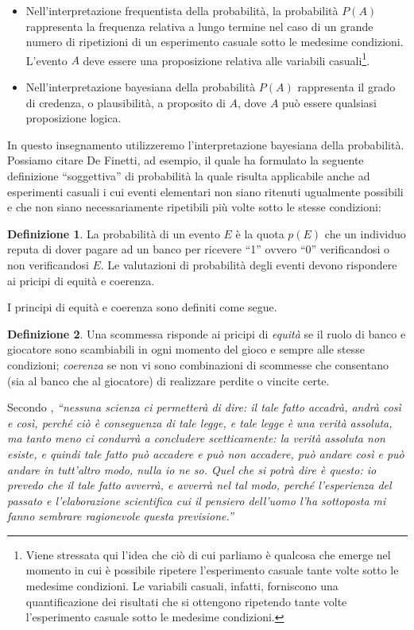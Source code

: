 \documentclass[
  11pt,
]{krantz}
\theoremstyle{definition}
\newtheorem{definition}{Definizione}[chapter]
\theoremstyle{definition}
\theoremstyle{definition}
\theoremstyle{definition}
\theoremstyle{remark}
\begin{document}
\begin{itemize}
\item
  Nell'interpretazione frequentista della probabilità, la probabilità \(P(A)\) rappresenta la frequenza relativa a lungo termine nel caso di un grande numero di ripetizioni di un esperimento casuale sotto le medesime condizioni. L'evento \(A\) deve essere una proposizione relativa alle variabili casuali\footnote{Viene stressata qui l'idea che ciò di cui parliamo è qualcosa che emerge nel momento in cui è possibile ripetere l'esperimento casuale tante volte sotto le medesime condizioni. Le variabili casuali, infatti, forniscono una quantificazione dei risultati che si ottengono ripetendo tante volte l'esperimento casuale sotto le medesime condizioni.}.
\item
  Nell'interpretazione bayesiana della probabilità \(P(A)\) rappresenta il grado di credenza, o plausibilità, a proposito di \(A\), dove \(A\) può essere qualsiasi proposizione logica.
\end{itemize}

In questo insegnamento utilizzeremo l'interpretazione bayesiana della probabilità. Possiamo citare De Finetti, ad esempio, il quale ha formulato la seguente definizione ``soggettiva'' di probabilità la quale risulta applicabile anche ad esperimenti casuali i cui eventi elementari non siano ritenuti ugualmente possibili e che non siano necessariamente ripetibili più volte sotto le stesse condizioni:

\begin{definition}
La probabilità di un evento \(E\) è la quota \(p(E)\) che un individuo reputa di dover pagare ad un banco per ricevere ``1'' ovvero ``0'' verificandosi o non verificandosi \(E\). Le valutazioni di probabilità degli eventi devono rispondere ai pricipi di equità e coerenza.
\end{definition}

I principi di equità e coerenza sono definiti come segue.

\begin{definition}
Una scommessa risponde ai pricipi di \emph{equità} se il ruolo di banco e giocatore sono scambiabili in ogni momento del gioco e sempre alle stesse condizioni; \emph{coerenza} se non vi sono combinazioni di scommesse che consentano (sia al banco che al giocatore) di realizzare perdite o vincite certe.
\end{definition}

Secondo \citet{definetti1931prob}, \emph{``nessuna scienza ci permetterà di dire: il tale fatto accadrà, andrà così e così, perché ciò è conseguenza di tale legge, e tale legge è una verità assoluta, ma tanto meno ci condurrà a concludere scetticamente: la verità assoluta non esiste, e quindi tale fatto può accadere e può non accadere, può andare così e può andare in tutt'altro modo, nulla io ne so. Quel che si potrà dire è questo: io prevedo che il tale fatto avverrà, e avverrà nel tal modo, perché l'esperienza del passato e l'elaborazione scientifica cui il pensiero dell'uomo l'ha sottoposta mi fanno sembrare ragionevole questa previsione.''}
\end{document}
